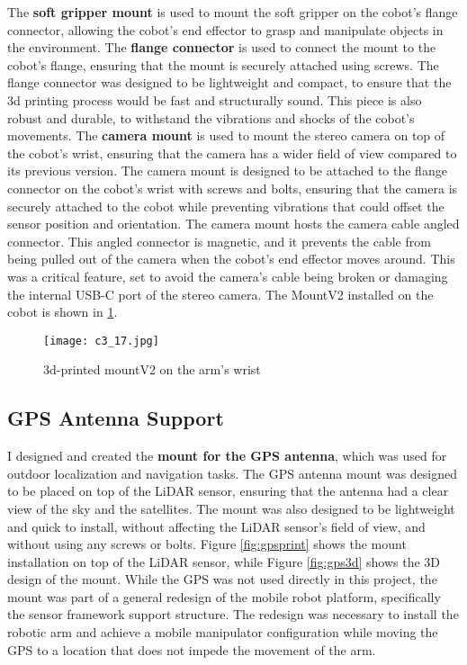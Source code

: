 The \textbf{soft gripper mount} is used to mount the soft gripper on the cobot's flange connector, allowing the cobot's
end effector to grasp and manipulate objects in the environment.
The \textbf{flange connector} is used to connect the mount to the cobot's flange, ensuring that the mount is securely 
attached using screws. The flange connector was designed to be lightweight and compact, 
to ensure that the 3d printing process would be fast and structurally sound. This piece is also
robust and durable, to withstand the vibrations and shocks of the cobot's movements.
The \textbf{camera mount} is used to mount the stereo camera on top of the cobot's wrist,
ensuring that the camera has a wider field of view compared to its previous version.
The camera mount is designed to be attached to the flange connector on the cobot's wrist with screws and bolts,
ensuring that the camera is securely attached to the cobot while preventing vibrations that could
offset the sensor position and orientation. The camera mount hosts the camera cable angled connector.
This angled connector is magnetic, and it prevents the cable from being pulled out of the camera when
the cobot's end effector moves around. This was a critical feature, set to avoid the camera's cable
being broken or damaging the internal USB-C port of the stereo camera. The MountV2 installed on the cobot
is shown in \ref{fig:c3_img17}.

\begin{figure}[t]
    \centering
    \texttt{[image: c3\_17.jpg]}
    \captionsetup{width=1\linewidth}
    \caption{3d-printed mountV2 on the arm's wrist}
    \label{fig:c3_img17}
\end{figure}

\subsection{GPS Antenna Support}

I designed and created the \textbf{mount for the GPS antenna}, which was used for outdoor localization
and navigation tasks. The GPS antenna mount was designed to be placed on top of the LiDAR sensor, ensuring
that the antenna had a clear view of the sky and the satellites. The mount was also designed to be lightweight
and quick to install, without affecting the LiDAR sensor's field of view, and without using any screws or bolts.
Figure \ref{fig:gpsprint} shows the mount installation on top of the LiDAR sensor, while Figure \ref{fig:gps3d}
shows the 3D design of the mount.
While the GPS was not used directly in this project, the mount was part of a general redesign of the mobile robot platform,
specifically the sensor framework support structure. The redesign was necessary to install the robotic arm and achieve
a mobile manipulator configuration while moving the GPS to a location that does not impede the movement of the arm.

